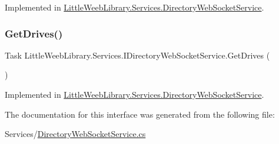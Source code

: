 Implemented in \mbox{\hyperlink{class_little_weeb_library_1_1_services_1_1_directory_web_socket_service_a37c3c5de12db8083e8e6d22ce1fe6776}{Little\+Weeb\+Library.\+Services.\+Directory\+Web\+Socket\+Service}}.

\mbox{\label{interface_little_weeb_library_1_1_services_1_1_i_directory_web_socket_service_a079ed5bda7dd1c9fa497bf3a1effacaa}} 
\subsubsection{\texorpdfstring{Get\+Drives()}{GetDrives()}}
{\footnotesize\ttfamily Task Little\+Weeb\+Library.\+Services.\+I\+Directory\+Web\+Socket\+Service.\+Get\+Drives (\begin{DoxyParamCaption}{ }\end{DoxyParamCaption})}



Implemented in \mbox{\hyperlink{class_little_weeb_library_1_1_services_1_1_directory_web_socket_service_a368f502e063381bccfed714d8350dc69}{Little\+Weeb\+Library.\+Services.\+Directory\+Web\+Socket\+Service}}.



The documentation for this interface was generated from the following file\+:\begin{DoxyCompactItemize}
\item 
Services/\mbox{\hyperlink{_directory_web_socket_service_8cs}{Directory\+Web\+Socket\+Service.\+cs}}\end{DoxyCompactItemize}
